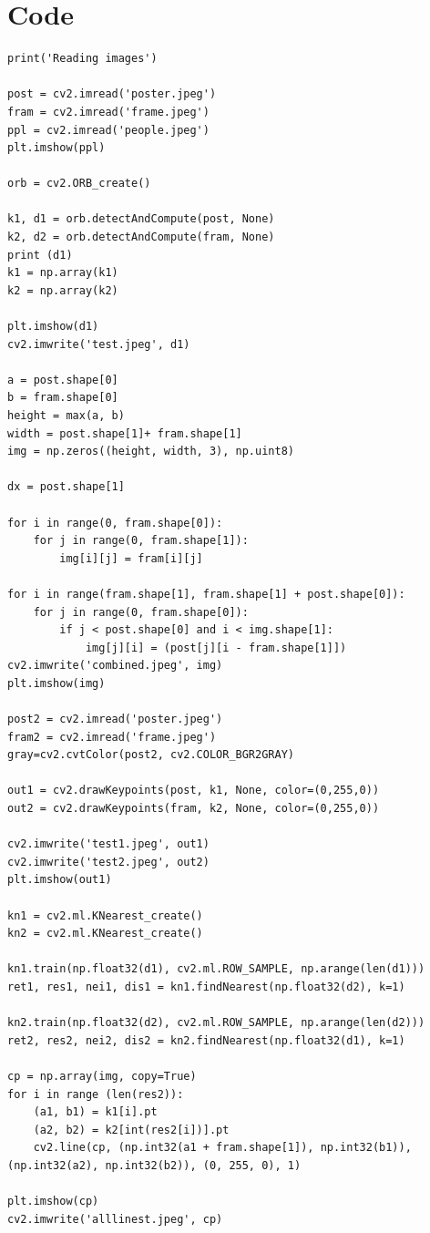 \documentclass{article}
\begin{document}
\section{Code}
\begin{verbatim}
print('Reading images')

post = cv2.imread('poster.jpeg')
fram = cv2.imread('frame.jpeg')
ppl = cv2.imread('people.jpeg')
plt.imshow(ppl)

orb = cv2.ORB_create()

k1, d1 = orb.detectAndCompute(post, None)
k2, d2 = orb.detectAndCompute(fram, None)
print (d1)
k1 = np.array(k1)
k2 = np.array(k2)

plt.imshow(d1)
cv2.imwrite('test.jpeg', d1)

a = post.shape[0]
b = fram.shape[0]
height = max(a, b)
width = post.shape[1]+ fram.shape[1]
img = np.zeros((height, width, 3), np.uint8)

dx = post.shape[1]

for i in range(0, fram.shape[0]):
    for j in range(0, fram.shape[1]):
        img[i][j] = fram[i][j]

for i in range(fram.shape[1], fram.shape[1] + post.shape[0]):
    for j in range(0, fram.shape[0]):
        if j < post.shape[0] and i < img.shape[1]:
            img[j][i] = (post[j][i - fram.shape[1]])
cv2.imwrite('combined.jpeg', img)
plt.imshow(img)

post2 = cv2.imread('poster.jpeg')
fram2 = cv2.imread('frame.jpeg')
gray=cv2.cvtColor(post2, cv2.COLOR_BGR2GRAY)

out1 = cv2.drawKeypoints(post, k1, None, color=(0,255,0))
out2 = cv2.drawKeypoints(fram, k2, None, color=(0,255,0))

cv2.imwrite('test1.jpeg', out1)
cv2.imwrite('test2.jpeg', out2)
plt.imshow(out1)

kn1 = cv2.ml.KNearest_create()
kn2 = cv2.ml.KNearest_create()

kn1.train(np.float32(d1), cv2.ml.ROW_SAMPLE, np.arange(len(d1)))
ret1, res1, nei1, dis1 = kn1.findNearest(np.float32(d2), k=1)

kn2.train(np.float32(d2), cv2.ml.ROW_SAMPLE, np.arange(len(d2)))
ret2, res2, nei2, dis2 = kn2.findNearest(np.float32(d1), k=1)

cp = np.array(img, copy=True)
for i in range (len(res2)):
    (a1, b1) = k1[i].pt
    (a2, b2) = k2[int(res2[i])].pt
    cv2.line(cp, (np.int32(a1 + fram.shape[1]), np.int32(b1)), (np.int32(a2), np.int32(b2)), (0, 255, 0), 1)

plt.imshow(cp)
cv2.imwrite('alllinest.jpeg', cp)


\end{verbatim}
\end{document}
